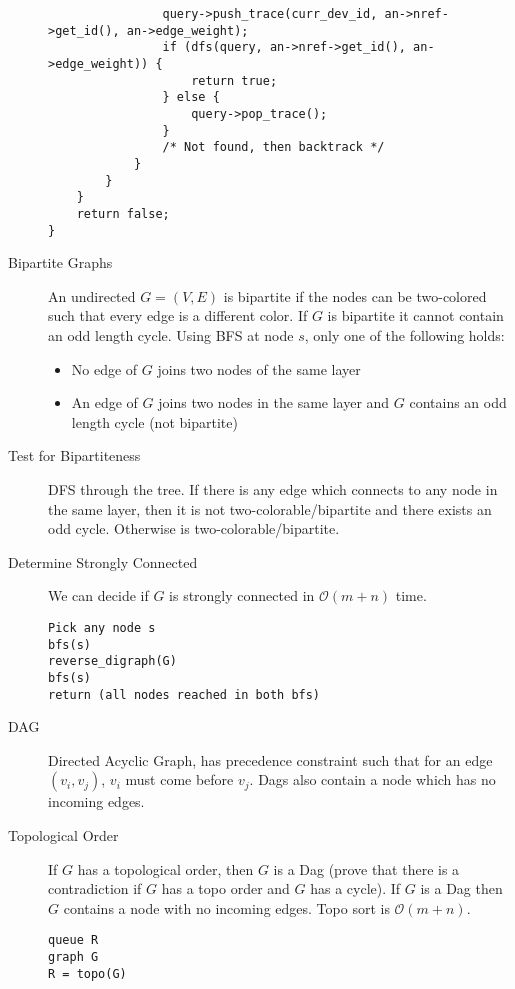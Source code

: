 \documentclass[8pt]{article}
\begin{document}
\begin{multicols}{2}
\begin{description}
{\begin{verbatim}
                query->push_trace(curr_dev_id, an->nref->get_id(), an->edge_weight);
                if (dfs(query, an->nref->get_id(), an->edge_weight)) {
                    return true;
                } else {
                    query->pop_trace();
                }
                /* Not found, then backtrack */
            }
        }
    }
    return false;
}
\end{verbatim}
    }
  \item[Bipartite Graphs] An undirected $G=(V,E)$ is bipartite if the
    nodes can be two-colored such that every edge is a different
    color. If $G$ is bipartite it cannot contain an odd length
    cycle. Using BFS at node $s$, only one of the following holds:
    \begin{itemize}
    \item No edge of $G$ joins two nodes of the same layer
    \item An edge of $G$ joins two nodes in the same layer and $G$
      contains an odd length cycle (not bipartite)
    \end{itemize}
  \item[Test for Bipartiteness] DFS through the tree. If there is any
    edge which connects to any node in the same layer, then it is not
    two-colorable/bipartite and there exists an odd cycle. Otherwise
    is two-colorable/bipartite.
  \item[Determine Strongly Connected] We can decide if $G$ is strongly
    connected in $\mathcal{O}(m+n)$ time.
    { \footnotesize
\begin{verbatim}
Pick any node s
bfs(s)
reverse_digraph(G)
bfs(s)
return (all nodes reached in both bfs)
\end{verbatim}
    }
  \item[DAG] Directed Acyclic Graph, has precedence constraint such that
    for an edge $(v_i,v_j)$, $v_i$ must come before $v_j$. Dags also
    contain a node which has no incoming edges.
  \item[Topological Order] If $G$ has a topological order, then $G$ is
    a Dag (prove that there is a contradiction if $G$ has a topo order
    and $G$ has a cycle). If $G$ is a Dag then $G$ contains a node
    with no incoming edges. Topo sort is $\mathcal{O}(m+n)$.
\begin{verbatim}
queue R
graph G
R = topo(G)


\end{verbatim}
\end{description}
\end{multicols}
\end{document}
